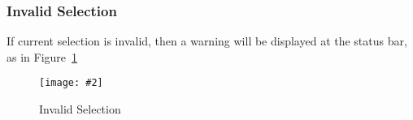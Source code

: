 \documentclass[12pt]{article}
\newcommand{\img}[3]{
\begin{figure}[!ht]
\begin{center}
\texttt{[image: \#2]}
\caption{#3}\label{#2}
\end{center}
\end{figure}
}
\begin{document}
\subsubsection{Invalid Selection}
If current selection is invalid, then a warning will be displayed at the status bar, as in Figure~\ref{board_invalid_selection}
\img{0.4}{board_invalid_selection}{Invalid Selection}



\end{document}
